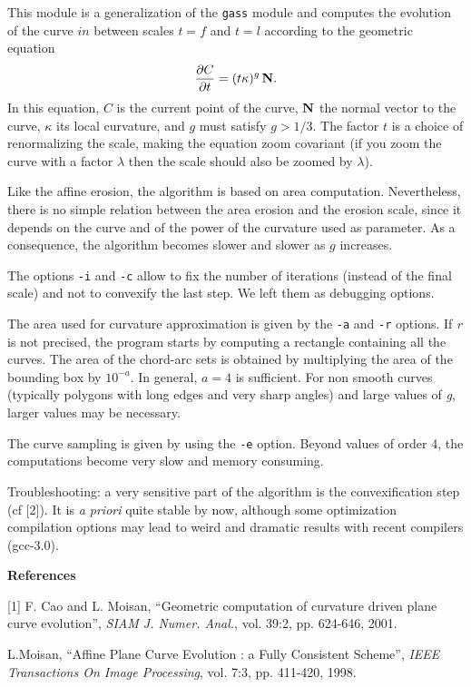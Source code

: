 This module is a generalization of the \verb+gass+ module and computes the
evolution of the curve $in$ between scales $t=f$ and $t=l$ according to
the geometric equation
$$\frac{\partial C}{\partial t}=(t\kappa)^g \,{\bf N}.$$
In this equation, $C$ is the current point of the curve, $\bf N$
the normal vector to the curve, $\kappa$ its local curvature, and 
$g$ must satisfy $g > 1/3$. 
The factor $t$ is a choice of renormalizing the scale,
making the equation zoom covariant (if you zoom the curve with a factor
$\lambda$ then the scale should also be zoomed by $\lambda$).

\medskip
Like the affine erosion, the algorithm is based on area
computation. Nevertheless, there is no simple relation between the area erosion
and the erosion scale, since it depends on the curve and of the power of the
curvature used as parameter. As a consequence, the algorithm becomes slower and
slower as $g$ increases.  


\medskip
The options \verb+-i+ and \verb+-c+ allow to fix the number of iterations
(instead of the final scale) and not to convexify the last step. We left them
as debugging options. 


\medskip 
The area used for curvature approximation is given by the \verb+-a+ and
\verb+-r+ options. If {\em r} is not precised, the program starts by computing
a rectangle containing all the curves. The area of the chord-arc sets is
obtained by multiplying the area of the bounding box by $10^{-a}$. In general,
$a=4$ is sufficient. For non smooth curves (typically polygons with long edges
and very sharp angles) and large values of {\em g}, larger values may be
necessary.  

\medskip 
The curve sampling is given by using the \verb+-e+ option. Beyond values of
order 4, the computations become very slow and memory consuming. 

\medskip
Troubleshooting: a very sensitive part of the algorithm is the convexification
step (cf [2]). It is {\em a priori} quite stable by now, although some
optimization compilation options may lead to weird and dramatic results with
recent compilers (gcc-3.0).  

\bigskip
{\Large\bf References}

\medskip

[1] F. Cao and L. Moisan, ``Geometric computation of curvature driven plane
curve evolution'', {\it SIAM J. Numer. Anal.}, vol. 39:2, pp. 624-646, 2001.

\medskip
[2] L.Moisan, ``Affine Plane Curve Evolution : a Fully Consistent Scheme'',
{\it IEEE Transactions On Image Processing}, vol. 7:3, pp. 411-420, 1998.
